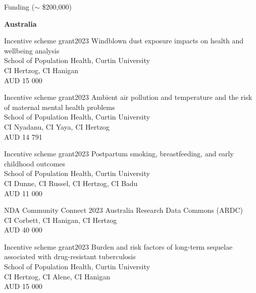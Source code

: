 \begin{rSection}{Funding ($\sim$ \$200,000)}
\begin{center}
\large \textbf{Australia}
\end{center}

\par
\begin{rSubsection}
{Incentive scheme grant}{2023}
{Windblown dust exposure impacts on health and wellbeing analysis}\\
{School of Population Health, Curtin University}\\
{CI Hertzog, CI Hanigan}\\
{AUD 15 000}
\end{rSubsection}

\begin{rSubsection}
{Incentive scheme grant}{2023}
{Ambient air pollution and temperature and the risk of maternal mental health problems}\\
{School of Population Health, Curtin University}\\
{CI Nyadanu, CI Yaya, CI Hertzog}\\
{AUD 14 791}
\end{rSubsection}

\begin{rSubsection}
{Incentive scheme grant}{2023}
{Postpartum smoking, breastfeeding, and early childhood outcomes}\\
{School of Population Health, Curtin University}\\
{CI Dunne, CI Russel, CI Hertzog, CI Badu}\\
{AUD 11 000}
\end{rSubsection}

\begin{rSubsection}
{NDA Community Connect }{2023}
{Australia Research Data Commons (ARDC)}\\
{CI Corbett, CI Hanigan, CI Hertzog}\\
{AUD 40 000}
\end{rSubsection}

\begin{rSubsection}
{Incentive scheme grant}{2023}
{Burden and risk factors of long-term sequelae associated with drug-resistant tuberculosis}\\
{School of Population Health, Curtin University}\\
{CI Hertzog, CI Alene, CI Hanigan}\\
{AUD 15 000}
\end{rSubsection}


\end{rSection}
